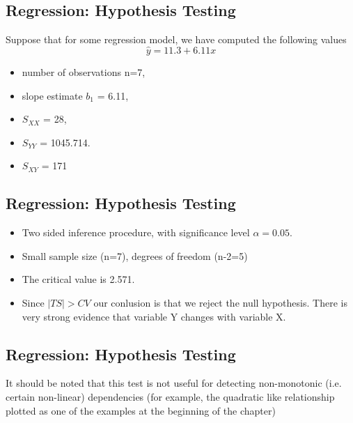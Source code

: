 \documentclass[]{report}
\begin{document}
%
%



\subsection{Regression: Hypothesis Testing}
Suppose that for some regression model, we have computed the following values
\[ \hat{y} = 11.3 + 6.11 x\]
\begin{itemize}
	\item number of observations n=7,
	\item slope estimate $b_1$ = 6.11,
	\item $S_{XX}$ = 28,
	\item $S_{YY}$ = 1045.714.
	\item $S_{XY}$ = 171
\end{itemize}


\subsection{Regression: Hypothesis Testing}
\begin{itemize}
	\item Two sided inference procedure, with significance level $\alpha=0.05$.
	\item Small sample size (n=7), degrees of freedom (n-2=5)
	\item The critical value is 2.571.
	\item Since $|TS|>CV$  our conlusion is that we reject the null hypothesis. There is very strong evidence
	that variable Y changes with variable X.
\end{itemize}




\subsection{Regression: Hypothesis Testing}
It should be noted that this test is not useful for detecting
non-monotonic (i.e. certain non-linear) dependencies (for example,
the quadratic like relationship plotted as one of the examples at
the beginning of the chapter)					
\end{document}
